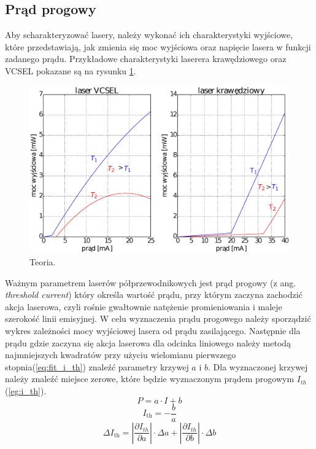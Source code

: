 \subsection{Prąd progowy}
Aby scharakteryzować lasery, należy wykonać ich charakterystyki wyjściowe, które przedstawiają, jak zmienia się moc wyjściowa oraz
napięcie lasera w funkcji zadanego prądu.
Przykładowe charakterystyki laserera krawędziowego oraz VCSEL pokazane są na rysunku \ref{fig:teoria_rys_1}.
\begin{figure}
\center
  \includegraphics[scale=0.30]{wykres2.eps}
  \caption{Teoria.}
  \label{fig:teoria_rys_1}
\end{figure}
Ważnym parametrem laserów półprzewodnikowych jest prąd progowy (z ang. \textit{threshold
current}) który określa wartość prądu, przy którym zaczyna zachodzić akcja laserowa, czyli
rośnie gwałtownie natężenie promieniowania i maleje szerokość linii emisyjnej. W celu wyznaczenia prądu progowego należy
sporządzić wykres zależności mocy wyjściowej lasera od prądu zasilającego. Następnie dla prądu gdzie zaczyna się akcja
laserowa dla odcinka liniowego należy metodą najmniejszych kwadratów przy użyciu wielomianu pierwszego stopnia(\ref{eq:fit_i_th})
 znaleźć parametry krzywej $a$ i $b$.
 Dla wyznaczonej krzywej należy znaleźć miejsce zerowe, które będzie wyznaczonym prądem progowym $I_{th}$(\ref{eg:i_th}).
\begin{equation}
\label{eq:fit_i_th}
P = a \cdot I + b
\end{equation}
\begin{equation}
\label{eg:i_th}
I_{\mathrm{th}} = -\frac{b}{a}
\end{equation}
\begin{equation}
\Delta I_{\mathrm{th}} = \left\lvert \frac{\partial I_{th}}{\partial a} \right\rvert \cdot \Delta a + \left\lvert \frac{\partial I_{th}}{\partial b} \right\rvert \cdot \Delta b
\end{equation}
